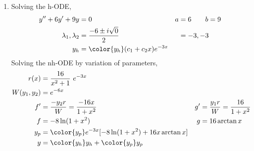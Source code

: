 \begin{enumerate}
    \item Solving the h-ODE,
          \begin{align}
              y'' + 6y' + 9y           & = 0                                     & a & = 6 \qquad b = 9 \\
              \lambda_{1}, \lambda_{2} & = \frac{-6 \pm i\sqrt{0}}{2}            &   & = -3, -3         \\
              y_{h}                    & = {\color{y_h} (c_{1} + c_{2}x)e^{-3x}}
          \end{align}
          Solving the nh-ODE by variation of parameters,
          \begin{align}
              r(x)            & = \frac{16}{x^{2} + 1}\ e^{-3x}                                                                            \\
              W(y_{1}, y_{2}) & = e^{-6x}                                                                                                  \\
              f'              & = \frac{-y_{2}r}{W} = \frac{-16x}{1 + x^{2}}              & g' & = \frac{y_{1}r}{W} = \frac{16}{1 + x^{2}} \\
              f               & = -8\ln(1 + x^{2})                                        & g  & = 16\arctan x                             \\
              y_{p}           & = {\color{y_p} e^{-3x}[-8\ln(1 + x^{2}) + 16x \arctan x]}                                                  \\
              y               & = {\color{y_h} y_{h}} + {\color{y_p} y_{p}}
          \end{align}


\end{enumerate}
